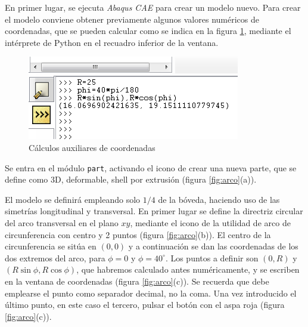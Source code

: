 \documentclass[spanish,a4paper,12pt]{article}
\begin{document}
En primer lugar, se ejecuta \emph{Abaqus CAE} para crear un modelo nuevo. Para crear el modelo conviene obtener previamente algunos valores numéricos de coordenadas, que se pueden calcular como se indica en la figura \ref{fig:python}, mediante el intérprete de Python en el recuadro inferior de  la ventana.
\begin{figure}[h!tbp]
\begin{center}\includegraphics[scale=0.5]{capturas/01-python-calculos-aux.png}\end{center}
\caption{Cálculos auxiliares de coordenadas}
\label{fig:python}
\end{figure}

Se entra en el módulo \texttt{part}, activando el icono de crear una nueva parte, que se define como 3D, deformable, shell por extrusión (figura \ref{fig:arco}(a)).

El modelo se definirá empleando solo $1/4$ de la bóveda, haciendo uso de las simetrías longitudinal y transversal.
En primer lugar se define la directriz circular del arco transversal en el plano $xy$, mediante el icono de la utilidad de arco de circunferencia con centro y 2 puntos (figura \ref{fig:arco}(b)). El centro de la circunferencia se sitúa en $(0,0)$ y a continuación se dan las coordenadas de los dos extremos del arco, para $\phi=0$ y $\phi=40^{\circ}$. 
Los puntos a definir son $(0,R)$ y $(R\sin\phi, R\cos\phi)$, que habremos calculado antes numéricamente, y se escriben en la ventana de coordenadas (figura \ref{fig:arco}(c)).
Se recuerda que debe emplearse el punto como separador decimal, no la coma.
Una vez introducido el último punto, en este caso el tercero, pulsar el botón con el aspa roja (figura \ref{fig:arco}(c)).
\end{document}
